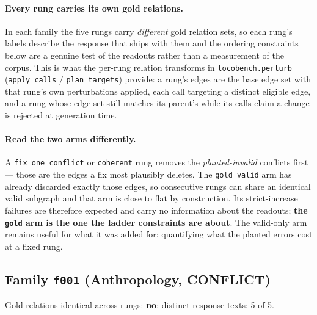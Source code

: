 \documentclass[11pt]{article}
\begin{document}
\paragraph{Every rung carries its own gold relations.} In each family the five rungs carry \emph{different} gold relation sets, so each rung's labels describe the response that ships with them and the ordering constraints below are a genuine test of the readouts rather than a measurement of the corpus. This is what the per-rung relation transforms in \texttt{locobench.perturb} (\texttt{apply\_calls} / \texttt{plan\_targets}) provide: a rung's edges are the base edge set with that rung's own perturbations applied, each call targeting a distinct eligible edge, and a rung whose edge set still matches its parent's while its calls claim a change is rejected at generation time.

\paragraph{Read the two arms differently.} A \texttt{fix\_one\_conflict} or \texttt{coherent} rung removes the \emph{planted-invalid} conflicts first --- those are the edges a fix most plausibly deletes. The \texttt{gold\_valid} arm has already discarded exactly those edges, so consecutive rungs can share an identical valid subgraph and that arm is close to flat by construction. Its strict-increase failures are therefore expected and carry no information about the readouts; \textbf{the \texttt{gold} arm is the one the ladder constraints are about}. The valid-only arm remains useful for what it was added for: quantifying what the planted errors cost at a fixed rung.

\subsection*{Family \texttt{f001} (Anthropology, CONFLICT)}

Gold relations identical across rungs: \textbf{no}; distinct response texts: 5 of 5.
\end{document}
